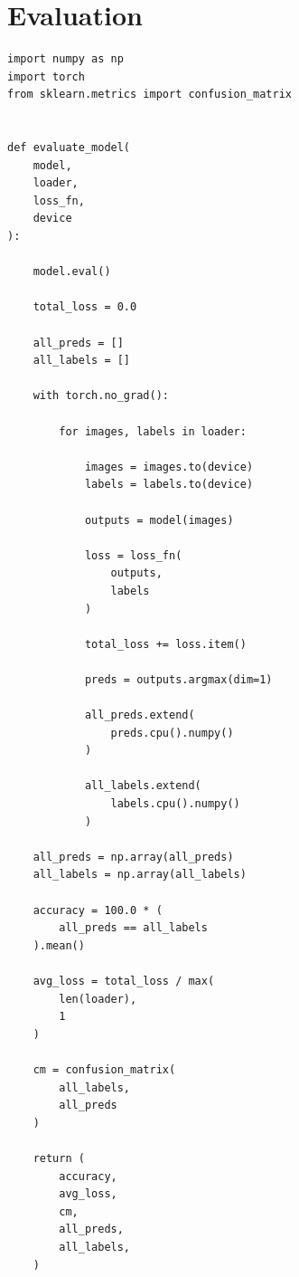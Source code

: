 \chapter{Evaluation}
\label{appendix:evaluation}

\begin{verbatim}
import numpy as np
import torch
from sklearn.metrics import confusion_matrix


def evaluate_model(
    model,
    loader,
    loss_fn,
    device
):

    model.eval()

    total_loss = 0.0

    all_preds = []
    all_labels = []

    with torch.no_grad():

        for images, labels in loader:

            images = images.to(device)
            labels = labels.to(device)

            outputs = model(images)

            loss = loss_fn(
                outputs,
                labels
            )

            total_loss += loss.item()

            preds = outputs.argmax(dim=1)

            all_preds.extend(
                preds.cpu().numpy()
            )

            all_labels.extend(
                labels.cpu().numpy()
            )

    all_preds = np.array(all_preds)
    all_labels = np.array(all_labels)

    accuracy = 100.0 * (
        all_preds == all_labels
    ).mean()

    avg_loss = total_loss / max(
        len(loader),
        1
    )

    cm = confusion_matrix(
        all_labels,
        all_preds
    )

    return (
        accuracy,
        avg_loss,
        cm,
        all_preds,
        all_labels,
    )
\end{verbatim}
